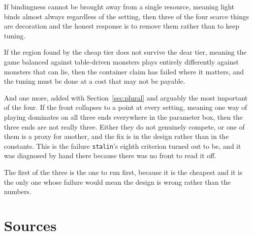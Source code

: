 \documentclass[11pt,a4paper]{article}
\begin{document}
If bindingness cannot be brought away from a single resource, meaning light binds almost always
regardless of the setting, then three of the four scarce things are decoration and the honest
response is to remove them rather than to keep tuning.

If the region found by the cheap tier does not survive the dear tier, meaning the game balanced
against table-driven monsters plays entirely differently against monsters that can lie, then the
container claim has failed where it matters, and the tuning must be done at a cost that may not
be payable.

And one more, added with Section~\ref{sec:plural} and arguably the most important of the four. If
the front collapses to a point at every setting, meaning one way of playing dominates on all three
ends everywhere in the parameter box, then the three ends are not really three. Either they do not
genuinely compete, or one of them is a proxy for another, and the fix is in the design rather than
in the constants. This is the failure \texttt{stalin}'s eighth criterion turned out to be, and it
was diagnosed by hand there because there was no front to read it off.

\begin{sectionbox}
The first of the three is the one to run first, because it is the cheapest and it is the only one
whose failure would mean the design is wrong rather than the numbers.
\end{sectionbox}

\section*{Sources}
\end{document}
